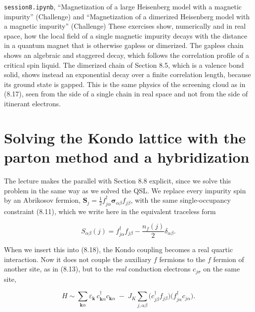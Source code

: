 \begin{notebookbox}{\texttt{session8.ipynb}, ``Magnetization of a large Heisenberg model with a magnetic impurity'' (Challenge) and ``Magnetization of a dimerized Heisenberg model with a magnetic impurity'' (Challenge)}
These exercises show, numerically and in real space, how the local field of a single magnetic
impurity decays with the distance in a quantum magnet that is otherwise gapless or dimerized. The
gapless chain shows an algebraic and staggered decay, which follows the correlation profile of a
critical spin liquid. The dimerized chain of Section 8.5, which is a valence bond solid, shows
instead an exponential decay over a finite correlation length, because its ground state is gapped.
This is the same physics of the screening cloud as in (8.17), seen from the side of a single chain
in real space and not from the side of itinerant electrons.
\end{notebookbox}

\section{Solving the Kondo lattice with the parton method and a hybridization}

The lecture makes the parallel with Section 8.8 explicit, since we solve this problem in the same
way as we solved the QSL. We replace every impurity spin by an Abrikosov fermion,
$\mathbf S_j = \tfrac12
f_{j\alpha}^\dagger \boldsymbol\sigma_{\alpha\beta} f_{j\beta}$, with the same single-occupancy
constraint (8.11), which we write here in the equivalent traceless form

\begin{equation}
S_{\alpha\beta}(j) = f^\dagger_{j\alpha}f_{j\beta} - \frac{n_f(j)}{2}\delta_{\alpha\beta}.
\end{equation}

When we insert this into (8.18), the Kondo coupling becomes a real quartic interaction. Now it does
not couple the auxiliary $f$ fermions to the $f$ fermion of another site, as in (8.13), but to the
\emph{real} conduction electrons $c_{j\sigma}$ on the same site,

\begin{equation}
H \sim \sum_{\mathbf k\alpha} \varepsilon_{\mathbf k}\, c^\dagger_{\mathbf k\alpha}c_{\mathbf
k\alpha} \;-\; J_K\sum_{j,\alpha\beta}\Big(c^\dagger_{j\beta}f_{j\beta}\Big)\Big(f^\dagger_{j\alpha}
c_{j\alpha}\Big).
\end{equation}

